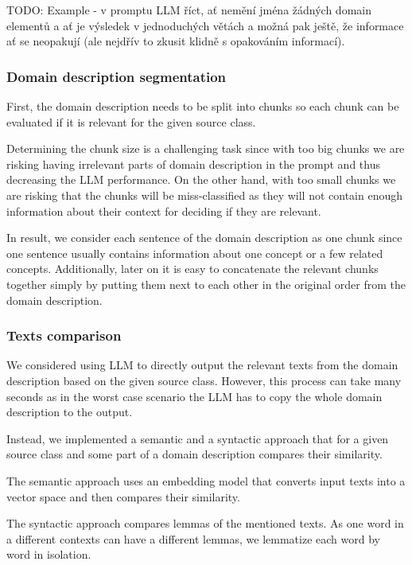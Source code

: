 TODO: Example - v promptu LLM říct, ať nemění jména žádných domain elementů a ať je výsledek v jednoduchých větách a možná pak ještě, že informace ať se neopakují (ale nejdřív to zkusit klidně s opakováním informací).


\subsubsection{Domain description segmentation}

First, the domain description needs to be split into chunks so each chunk can be evaluated if it is relevant for the given source class.

Determining the chunk size is a challenging task since with too big chunks we are risking having irrelevant parts of domain description in the prompt and thus decreasing the LLM performance. On the other hand, with too small chunks we are risking that the chunks will be miss-classified as they will not contain enough information about their context for deciding if they are relevant.

In result, we consider each sentence of the domain description as one chunk since one sentence usually contains information about one concept or a few related concepts. Additionally, later on it is easy to concatenate the relevant chunks together simply by putting them next to each other in the original order from the domain description.


\subsubsection{Texts comparison}
\label{texts_comparison}
  
We considered using LLM to directly output the relevant texts from the domain description based on the given source class. However, this process can take many seconds as in the worst case scenario the LLM has to copy the whole domain description to the output.

Instead, we implemented a semantic and a syntactic approach that for a given source class and some part of a domain description compares their similarity.
 
The semantic approach uses an embedding model that converts input texts into a vector space and then compares their similarity.

The syntactic approach compares lemmas of the mentioned texts. As one word in a different contexts can have a different lemmas, we lemmatize each word by word in isolation. \\

